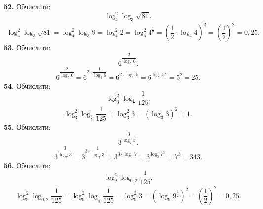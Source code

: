 \textbf{52.} Обчислити:
$$
\log^{2}_{4}\log_{3}\sqrt{81}.
$$
\begin{gather*}
\log^{2}_{4}\log_{3}\sqrt{81}=
\log^{2}_{4}\log_{3}9=
\log^{2}_{4}2=
\log^{2}_{4}4^{\frac{1}{2}}=
\left(\dfrac{1}{2}\cdot\log_{4}4\right)^2=
\left(\dfrac{1}{2}\right)^2=0,25.
\end{gather*}
\textbf{53.} Обчислити:
$$
6^{\dfrac{2}{\log_{5}6}}.
$$
\begin{gather*}
6^{\dfrac{2}{\log_{5}6}}=
6^{2\cdot\dfrac{1}{\log_{5}6}}=
6^{2\cdot\log_{6}5}=
6^{\log_{6}5^2}=5^2=25.
\end{gather*}
\textbf{54.} Обчислити:
$$
\log^{2}_{3}\log_{\frac{1}{5}}\dfrac{1}{125}.
$$
\begin{gather*}
\log^{2}_{3}\log_{\frac{1}{5}}\dfrac{1}{125}=
\log^{2}_{3}3=
\left(\log_{3}3\right)^2=1.
\end{gather*}
\textbf{55.} Обчислити:
$$
3^{\dfrac{3}{\log_{7}3}}.
$$
\begin{gather*}
3^{\dfrac{3}{\log_{7}3}}=
3^{3\cdot\dfrac{1}{\log_{7}3}}=
3^{3\cdot\log_{3}7}=
3^{\log_{3}7^3}=7^3=343.
\end{gather*}
\textbf{56.} Обчислити:
$$
\log^{2}_{9}\log_{0,2}\dfrac{1}{125}.
$$
\begin{gather*}
\log^{2}_{9}\log_{0,2}\dfrac{1}{125}=
\log^{2}_{9}\log_{\frac{1}{5}}\dfrac{1}{125}=
\log^{2}_{9}3=
\left(\log_{9}9^{\frac{1}{2}}\right)^2=
\left(\dfrac{1}{2}\right)^2=0,25.
\end{gather*}
